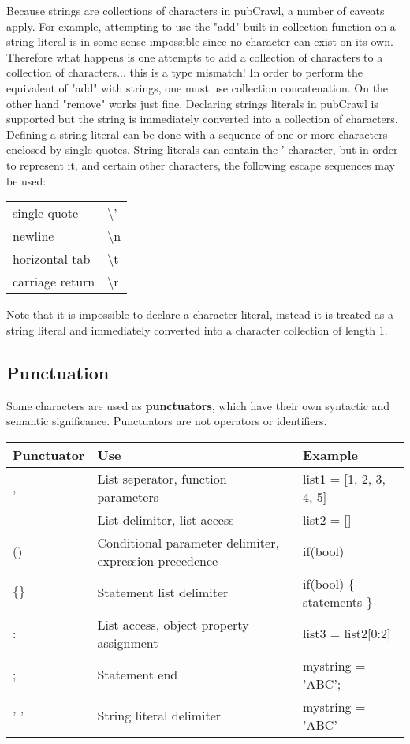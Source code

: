 \documentclass[oneside]{book}
\begin{document}
Because strings are collections of characters in pubCrawl, a number of caveats apply. For example, attempting to use the "add" built in collection function on a string literal is in some sense impossible since no character can exist on its own. Therefore what happens is one attempts to add a collection of characters to a collection of characters... this is a type mismatch! In order to perform the equivalent of "add" with strings, one must use collection concatenation. On the other hand "remove" works just fine. Declaring strings literals in pubCrawl is supported but the string is immediately converted into a collection of characters. Defining a string literal can be done with a sequence of one or more characters enclosed by single quotes. String literals can contain the ' character, but in order to represent it, and certain other characters, the following escape sequences may be used:
\begin{center}
  \begin{tabular}{l l}
  single quote&\textbackslash '\\
  newline&\textbackslash n\\
  horizontal tab&\textbackslash t\\
  carriage return&\textbackslash r\\
  \end{tabular}
\end{center}
Note that it is impossible to declare a character literal, instead it is treated as a string literal and immediately converted into a character collection of length 1.

\subsection{Punctuation}
Some characters are used as \textbf{punctuators}, which have their own syntactic and semantic significance. Punctuators are not operators or identifiers.\\
\begin{center}
  \begin{tabular}{| l | l | l |}
    \hline
    \textbf{Punctuator} & \textbf{Use} & \textbf{Example} \\ \hline
    , & List seperator, function parameters & list1 = [1, 2, 3, 4, 5] \\ \hline
    [] & List delimiter, list access & list2 = [] \\ \hline
    () & Conditional parameter delimiter, expression precedence & if(bool)\\ \hline
    $\{\}$ & Statement list delimiter & if(bool) $\{$ statements $\}$\\ \hline
    : & List access, object property assignment & list3 = list2[0:2]\\ \hline
    ; & Statement end & mystring = 'ABC';\\ \hline
    ' ' & String literal delimiter & mystring = 'ABC'\\ \hline
    \hline
  \end{tabular}
\end{center}
\end{document}
